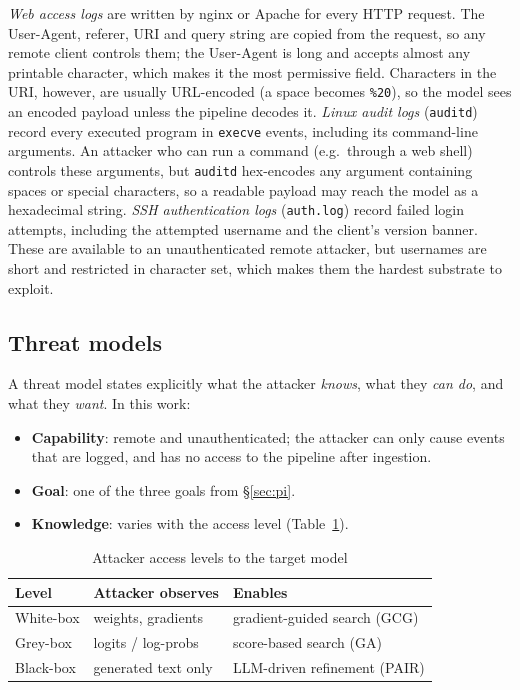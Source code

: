 \emph{Web access logs} are written by nginx or Apache for every HTTP request. The User-Agent, referer, URI and query string are copied from the request, so any remote client controls them; the User-Agent is long and accepts almost any printable character, which makes it the most permissive field. Characters in the URI, however, are usually URL-encoded (a space becomes \texttt{\%20}), so the model sees an encoded payload unless the pipeline decodes it.
\emph{Linux audit logs} (\texttt{auditd}) record every executed program in \texttt{execve} events, including its command-line arguments. An attacker who can run a command (e.g.\ through a web shell) controls these arguments, but \texttt{auditd} hex-encodes any argument containing spaces or special characters, so a readable payload may reach the model as a hexadecimal string.
\emph{SSH authentication logs} (\texttt{auth.log}) record failed login attempts, including the attempted username and the client's version banner. These are available to an unauthenticated remote attacker, but usernames are short and restricted in character set, which makes them the hardest substrate to exploit.

\subsection{Threat models}

A threat model states explicitly what the attacker \emph{knows}, what they \emph{can do}, and what they \emph{want}. In this work:
\begin{itemize}
\item \textbf{Capability}: remote and unauthenticated; the attacker can only cause events that are logged, and has no access to the pipeline after ingestion.
\item \textbf{Goal}: one of the three goals from \S\ref{sec:pi}.
\item \textbf{Knowledge}: varies with the access level (Table~\ref{tab:access}).
\end{itemize}

\begin{table}[t]
\caption{Attacker access levels to the target model}
\label{tab:access}
\centering
\footnotesize
\begin{tabular}{|l|p{}|p{}|}
\hline
\textbf{Level} & \textbf{Attacker observes} & \textbf{Enables} \\
\hline
White-box & weights, gradients & gradient-guided search (GCG) \\
\hline
Grey-box & logits / log-probs & score-based search (GA) \\
\hline
Black-box & generated text only & LLM-driven refinement (PAIR) \\
\hline
\end{tabular}
\end{table}


